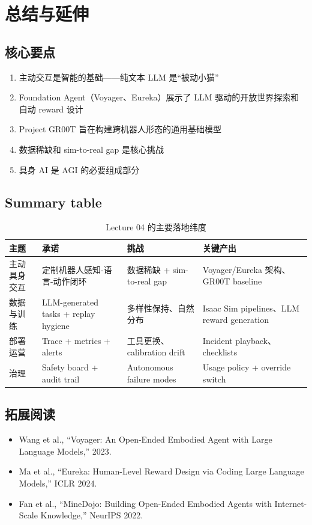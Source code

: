 \section{总结与延伸}

\subsection{核心要点}

\begin{enumerate}
    \item 主动交互是智能的基础——纯文本 LLM 是``被动小猫''
    \item Foundation Agent（Voyager、Eureka）展示了 LLM 驱动的开放世界探索和自动 reward 设计
    \item Project GR00T 旨在构建跨机器人形态的通用基础模型
    \item 数据稀缺和 sim-to-real gap 是核心挑战
    \item 具身 AI 是 AGI 的必要组成部分
\end{enumerate}

\subsection{Summary table}

\begin{table}[H]
\centering
\begin{tabular}{p{} p{} p{} p{}}
\toprule
主题 & 承诺 & 挑战 & 关键产出 \\
\midrule
主动具身交互 & 定制机器人感知-语言-动作闭环 & 数据稀缺 + sim-to-real gap & Voyager/Eureka 架构、GR00T baseline \\
数据与训练 & LLM-generated tasks + replay hygiene & 多样性保持、自然分布 & Isaac Sim pipelines、LLM reward generation \\
部署运营 & Trace + metrics + alerts & 工具更换、calibration drift & Incident playback、checklists \\
治理 & Safety board + audit trail & Autonomous failure modes & Usage policy + override switch \\
\bottomrule
\end{tabular}
\caption{Lecture 04 的主要落地纬度}
\end{table}

\subsection{拓展阅读}

\begin{itemize}
    \item Wang et al., ``Voyager: An Open-Ended Embodied Agent with Large Language Models,'' 2023.
    \item Ma et al., ``Eureka: Human-Level Reward Design via Coding Large Language Models,'' ICLR 2024.
    \item Fan et al., ``MineDojo: Building Open-Ended Embodied Agents with Internet-Scale Knowledge,'' NeurIPS 2022.
\end{itemize}



